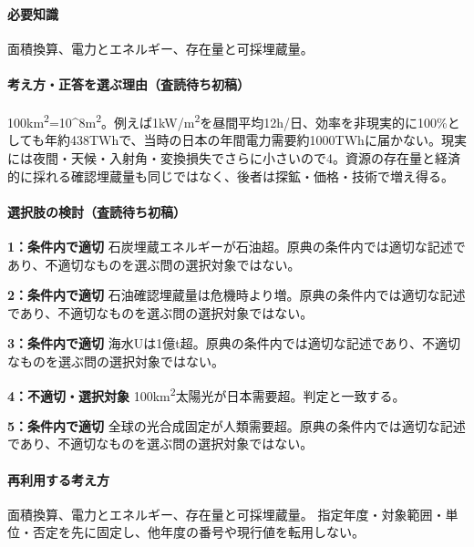 \paragraph{必要知識} 面積換算、電力とエネルギー、存在量と可採埋蔵量。

\paragraph{考え方・正答を選ぶ理由（査読待ち初稿）} 100km\textsuperscript{2}=10\textasciicircum{}8m\textsuperscript{2}。例えば1kW/m\textsuperscript{2}を昼間平均12h/日、効率を非現実的に100\%としても年約438TWhで、当時の日本の年間電力需要約1000TWhに届かない。現実には夜間・天候・入射角・変換損失でさらに小さいので4。資源の存在量と経済的に採れる確認埋蔵量も同じではなく、後者は探鉱・価格・技術で増え得る。

\paragraph{選択肢の検討（査読待ち初稿）}\mbox{}\par

\noindent\textbf{1：条件内で適切} 石炭埋蔵エネルギーが石油超。原典の条件内では適切な記述であり、不適切なものを選ぶ問の選択対象ではない。\par

\noindent\textbf{2：条件内で適切} 石油確認埋蔵量は危機時より増。原典の条件内では適切な記述であり、不適切なものを選ぶ問の選択対象ではない。\par

\noindent\textbf{3：条件内で適切} 海水Uは1億t超。原典の条件内では適切な記述であり、不適切なものを選ぶ問の選択対象ではない。\par

\noindent\textbf{4：不適切・選択対象} 100km\textsuperscript{2}太陽光が日本需要超。判定と一致する。\par

\noindent\textbf{5：条件内で適切} 全球の光合成固定が人類需要超。原典の条件内では適切な記述であり、不適切なものを選ぶ問の選択対象ではない。\par

\paragraph{再利用する考え方} 面積換算、電力とエネルギー、存在量と可採埋蔵量。 指定年度・対象範囲・単位・否定を先に固定し、他年度の番号や現行値を転用しない。

